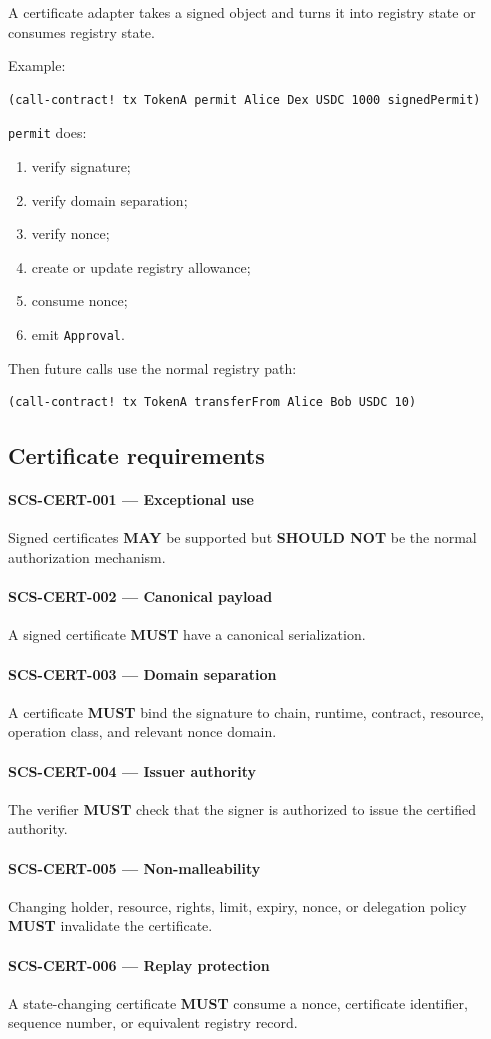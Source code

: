 \documentclass[11pt]{article}
\newcommand{\MUST}{\textbf{MUST}}
\newcommand{\SHOULDNOT}{\textbf{SHOULD NOT}}
\newcommand{\MAY}{\textbf{MAY}}
\newcommand{\req}[2]{\paragraph{#1}#2\par}
\newcommand{\code}[1]{\texttt{#1}}
\begin{document}
A certificate adapter takes a signed object and turns it into registry state or consumes registry state.

Example:

\begin{lstlisting}
(call-contract! tx TokenA permit Alice Dex USDC 1000 signedPermit)
\end{lstlisting}

\code{permit} does:

\begin{enumerate}
  \item verify signature;
  \item verify domain separation;
  \item verify nonce;
  \item create or update registry allowance;
  \item consume nonce;
  \item emit \code{Approval}.
\end{enumerate}

Then future calls use the normal registry path:

\begin{lstlisting}
(call-contract! tx TokenA transferFrom Alice Bob USDC 10)
\end{lstlisting}

\subsection{Certificate requirements}

\req{SCS-CERT-001 --- Exceptional use}{Signed certificates \MAY{} be supported but \SHOULDNOT{} be the normal authorization mechanism.}

\req{SCS-CERT-002 --- Canonical payload}{A signed certificate \MUST{} have a canonical serialization.}

\req{SCS-CERT-003 --- Domain separation}{A certificate \MUST{} bind the signature to chain, runtime, contract, resource, operation class, and relevant nonce domain.}

\req{SCS-CERT-004 --- Issuer authority}{The verifier \MUST{} check that the signer is authorized to issue the certified authority.}

\req{SCS-CERT-005 --- Non-malleability}{Changing holder, resource, rights, limit, expiry, nonce, or delegation policy \MUST{} invalidate the certificate.}

\req{SCS-CERT-006 --- Replay protection}{A state-changing certificate \MUST{} consume a nonce, certificate identifier, sequence number, or equivalent registry record.}
\end{document}
